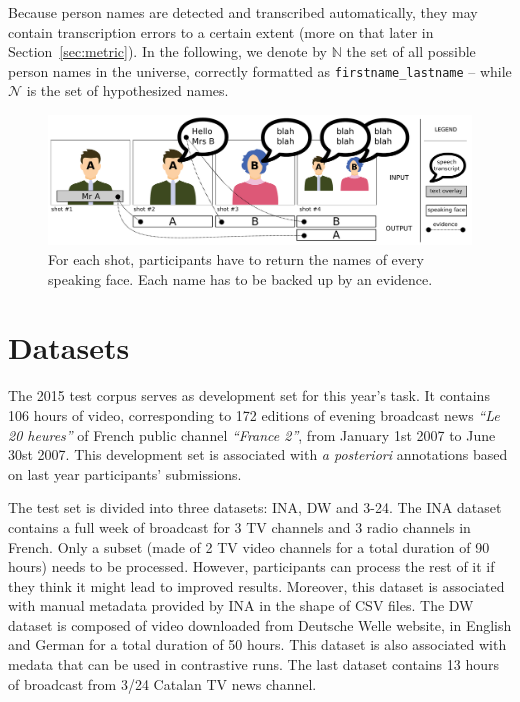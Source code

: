 \documentclass{acm_proc_article-me}
\newcommand\refNames{\mathbb{N}}
\newcommand\hypNames{\mathcal{N}}
\begin{document}
Because person names are detected and transcribed automatically, they may contain transcription errors to a certain extent (more on that later in Section~\ref{sec:metric}). In the following, we denote by $\refNames$ the set of all possible person names in the universe, correctly formatted as \texttt{firstname\_lastname} -- while $\hypNames$ is the set of hypothesized names.

\begin{figure}[!htb]
 \centering
 \includegraphics[width=1.\linewidth]{figs/evidence.pdf}
 \vspace{-0.5cm}
 \caption{For each shot, participants have to return the names of every speaking face. Each name has to be backed up by an evidence.}
 \label{fig:evidence}
\end{figure}

\vspace{-0.1cm}
\section{Datasets}

The 2015 test corpus serves as development set for this year's task. It contains 106 hours of video, corresponding to 172 editions of evening broadcast news \emph{``Le 20 heures''} of French public channel \emph{``France 2''}, from January 1st 2007 to June 30st 2007. This development set is associated with \emph{a posteriori} annotations based on last year participants' submissions. 

The test set is divided into three datasets: INA, DW and 3-24. The INA dataset contains a full week of broadcast for 3 TV channels and 3 radio channels in French. Only a subset (made of 2 TV video channels for a total duration of 90 hours) needs to be processed. However, participants can process the rest of it if they think it might lead to improved results. Moreover, this dataset is associated with manual metadata provided by INA in the shape of CSV files. The DW dataset is composed of video downloaded from Deutsche Welle website, in English and German for a total duration of 50 hours. This dataset is also associated with medata that can be used in contrastive runs. The last dataset contains 13 hours of broadcast from 3/24 Catalan TV news channel.
\end{document}
